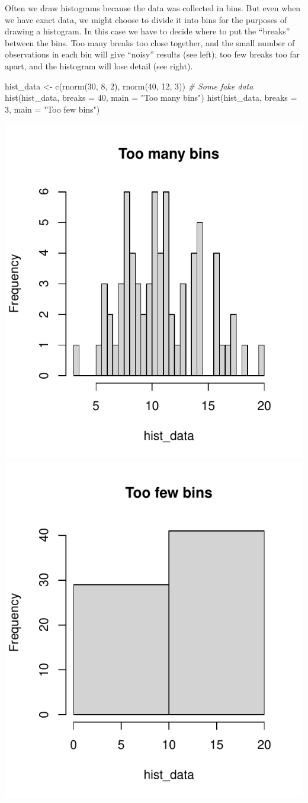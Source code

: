 \documentclass[
  a4paper,
]{book}
\newenvironment{Shaded}{\begin{snugshade}}{\end{snugshade}}
\newcommand{\AttributeTok}[1]{\textcolor[rgb]{0.77,0.63,0.00}{#1}}
\newcommand{\CommentTok}[1]{\textcolor[rgb]{0.56,0.35,0.01}{\textit{#1}}}
\newcommand{\DecValTok}[1]{\textcolor[rgb]{0.00,0.00,0.81}{#1}}
\newcommand{\FunctionTok}[1]{\textcolor[rgb]{0.00,0.00,0.00}{#1}}
\newcommand{\NormalTok}[1]{#1}
\newcommand{\OtherTok}[1]{\textcolor[rgb]{0.56,0.35,0.01}{#1}}
\newcommand{\StringTok}[1]{\textcolor[rgb]{0.31,0.60,0.02}{#1}}
\theoremstyle{definition}
\theoremstyle{definition}
\theoremstyle{definition}
\theoremstyle{definition}
\theoremstyle{remark}
\begin{document}
Often we draw histograms because the data was collected in bins. But even when we have exact data, we might choose to divide it into bins for the purposes of drawing a histogram. In this case we have to decide where to put the ``breaks'' between the bins. Too many breaks too close together, and the small number of observations in each bin will give ``noisy'' results (see left); too few breaks too far apart, and the histogram will lose detail (see right).

\begin{Shaded}
\begin{Highlighting}[]
\NormalTok{hist\_data }\OtherTok{\textless{}{-}} \FunctionTok{c}\NormalTok{(}\FunctionTok{rnorm}\NormalTok{(}\DecValTok{30}\NormalTok{, }\DecValTok{8}\NormalTok{, }\DecValTok{2}\NormalTok{), }\FunctionTok{rnorm}\NormalTok{(}\DecValTok{40}\NormalTok{, }\DecValTok{12}\NormalTok{, }\DecValTok{3}\NormalTok{))  }\CommentTok{\# Some fake data}
\FunctionTok{hist}\NormalTok{(hist\_data, }\AttributeTok{breaks =} \DecValTok{40}\NormalTok{, }\AttributeTok{main =} \StringTok{"Too many bins"}\NormalTok{)}
\FunctionTok{hist}\NormalTok{(hist\_data, }\AttributeTok{breaks =} \DecValTok{3}\NormalTok{,  }\AttributeTok{main =} \StringTok{"Too few bins"}\NormalTok{)}
\end{Highlighting}
\end{Shaded}

\includegraphics[width=0.48\linewidth]{math1710_files/figure-latex/hist-bins-1} \includegraphics[width=0.48\linewidth]{math1710_files/figure-latex/hist-bins-2}
\end{document}
